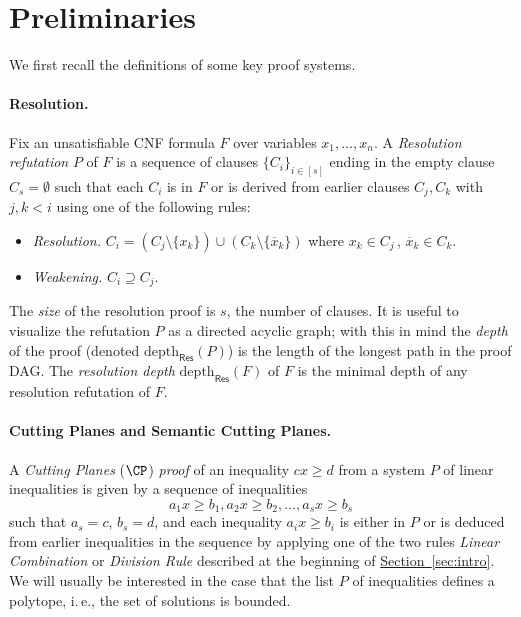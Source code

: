\documentclass[11pt]{article}
\numberwithin{equation}{section}
\theoremstyle{definition}
\theoremstyle{plain}
\newcommand{\ie}{i.\,e.}
\newcommand{\expref}[2]{\hyperref[#2]{#1~\ref{#2}}}
\newcommand{\set}[1]{\{ #1 \}}
\newcommand{\depth}{\ensuremath{\mathrm{depth}}}
\newcommand{\Res}{\ensuremath{\mathsf{Res}}}
\begin{document}
\section{Preliminaries} 
\label{sec:prelims}
%


We first recall the definitions of some key proof systems.

\paragraph{Resolution.} Fix an unsatisfiable CNF formula $F$ over variables $x_1, \ldots, x_n$. 
A \emph{Resolution refutation} $P$ of $F$ is a sequence of clauses $\set{C_i}_{i \in [s]}$ ending in the empty clause $C_s = \emptyset$ such that each $C_i$ is in $F$ or is derived from earlier clauses $C_j, C_k$ with $j, k < i$ using one of the following rules:
\begin{itemize}
	\item \emph{Resolution.} $C_i = (C_j \setminus \set{x_k}) \cup (C_k \setminus \set{\overline x_k})$ where $x_k \in C_j\,$, $\overline x_k \in C_k$.
	\item \emph{Weakening.} $C_i \supseteq C_j$.
\end{itemize}
The \emph{size} of the resolution proof is $s$, the number of clauses.
It is useful to visualize the refutation $P$ as a directed acyclic graph; with this in mind the \emph{depth} of the proof (denoted $\depth_{\Res}(P)$) is the length of the longest path in the proof DAG.
The \emph{resolution depth} $\depth_{\Res}(F)$ of $F$ is the minimal depth of any resolution refutation of $F$.

\paragraph{Cutting Planes and Semantic Cutting Planes.} A \emph{Cutting Planes} ($\CP$)
\emph{proof} of an inequality $cx \geq d$ from a
%
system $P$ of linear inequalities %
is given by a sequence of inequalities \[ a_1x \geq b_1, a_2x \geq b_2, \ldots, a_s x \geq b_s \]
such that $a_s = c$, $b_s = d$, and each inequality $a_ix \geq b_i$ is either in $P$ or is deduced from earlier inequalities in the sequence by applying one of the two rules \emph{Linear Combination} or \emph{Division Rule} described at the beginning of \expref{Section}{sec:intro}.
We will usually be interested in the case that the
%
list $P$ of inequalities   %
defines a polytope, %
%
\ie, the set of solutions is bounded.  %
%
%
%
\end{document}
